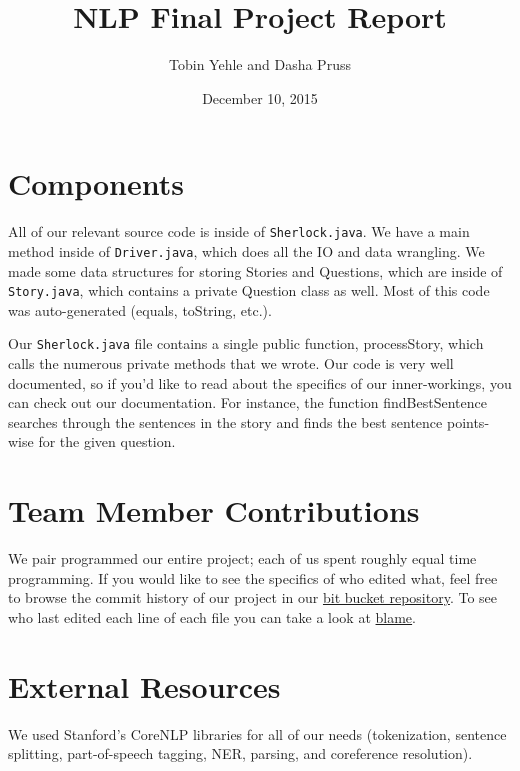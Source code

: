 \documentclass[twoside,11pt]{article}
\newcommand{\class}{NLP}
\newcommand{\name}{Final Project Report}
\newcommand{\due}{December 10, 2015}
\newcommand{\code}[1]{\texttt{#1}}
\begin{document}
\date{\due}
\title{\class{} \name \vspace{-0.2cm}}
\author{ Tobin Yehle and Dasha Pruss}
\maketitle
\vspace{-1.3cm}


\section{Components}

All of our relevant source code is inside of \code{Sherlock.java}. We have a main method inside of \code{Driver.java}, which does all the IO and data wrangling. We made some data structures for storing Stories and Questions, which are inside of \code{Story.java}, which contains a private Question class as well. Most of this code was auto-generated (equals, toString, etc.).

Our \code{Sherlock.java} file contains a single public function, processStory, which calls the numerous private methods that we wrote. Our code is very well documented, so if you'd like to read about the specifics of our inner-workings, you can check out our documentation. For instance, the function findBestSentence searches through the sentences in the story and finds the best sentence points-wise for the given question.

\section{Team Member Contributions}
We pair programmed our entire project; each of us spent roughly equal time programming. If you would like to see the specifics of who edited what, feel free to browse the commit history of our project in our  \href{https://bitbucket.org/tobinyehle/sherlock/commits/all}{bit bucket repository}. To see who last edited each line of each file you can take a look at \href{https://bitbucket.org/tobinyehle/sherlock/annotate/e57a8467bc90e614b13ca2c99f0b5d681baa65c9/src/cs/utah/sherlock/Sherlock.java?at=default&fileviewer=file-view-default}{blame}.

\section{External Resources}

We used Stanford's CoreNLP libraries for all of our needs (tokenization, sentence splitting, part-of-speech tagging, NER, parsing, and coreference resolution).
\end{document}

